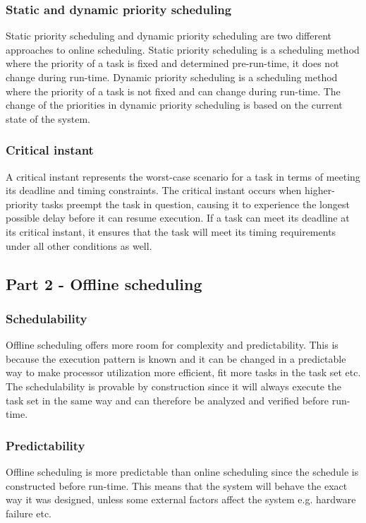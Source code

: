             \subsubsection{Static and dynamic priority scheduling}
            Static priority scheduling and dynamic priority scheduling are two different approaches to online scheduling. Static priority scheduling is a scheduling method where the priority of a task is fixed and determined pre-run-time, it does not change during run-time. Dynamic priority scheduling is a scheduling method where the priority of a task is not fixed and can change during run-time. The change of the priorities in dynamic priority scheduling is based on the current state of the system.

            \subsubsection{Critical instant}
            A critical instant represents the worst-case scenario for a task in terms of meeting its deadline and timing constraints. The critical instant occurs when higher-priority tasks preempt the task in question, causing it to experience the longest possible delay before it can resume execution. If a task can meet its deadline at its critical instant, it ensures that the task will meet its timing requirements under all other conditions as well.

        \subsection{Part 2 - Offline scheduling}
            \subsubsection{Schedulability}
            Offline scheduling offers more room for complexity and predictability. This is because the execution pattern is known and it can be changed in a predictable way to make processor utilization more efficient, fit more tasks in the task set etc. The schedulability is provable by construction since it will always execute the task set in the same way and can therefore be analyzed and verified before run-time.

            \subsubsection{Predictability}
            Offline scheduling is more predictable than online scheduling since the schedule is constructed before run-time. This means that the system will behave the exact way it was designed, unless some external factors affect the system e.g. hardware failure etc.

